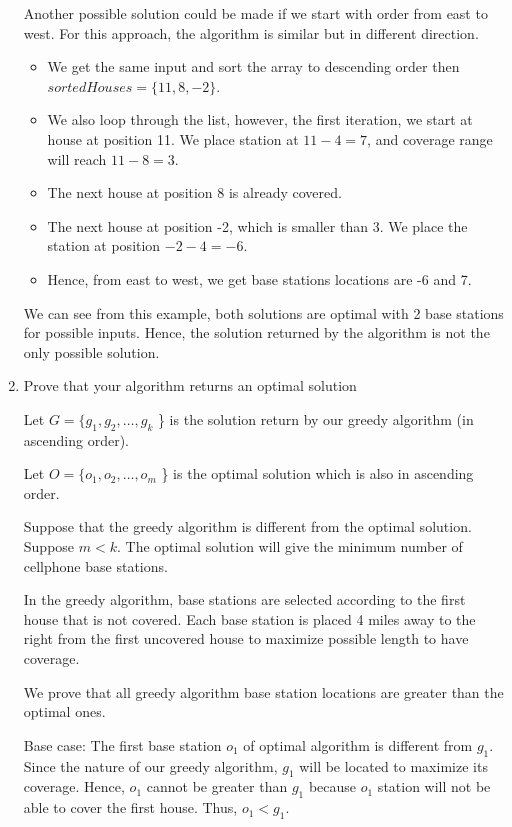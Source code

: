 \documentclass{cpsc413Solutions}
\begin{document}
\begin{problemlist}
\begin{problem}
\begin{answer}
\begin{enumerate}
    Another possible solution could be made if we start with order from east to west. For this approach, the algorithm is similar but in different direction.
    \begin{itemize}
        \item We get the same input and sort the array to descending order then $sortedHouses = \{11,8,-2\}$.
        \item We also loop through the list, however, the first iteration, we start at house at position 11. We place station at $11-4=7$, and coverage range will reach $11-8=3$.
        \item The next house at position 8 is already covered.
        \item The next house at position -2, which is smaller than 3. We place the station at position $-2-4=-6$.
        \item Hence, from east to west, we get base stations locations are -6 and 7.
    \end{itemize}
    
    We can see from this example, both solutions are optimal with 2 base stations for possible inputs. Hence, the solution returned by the algorithm is not the only possible solution.
    
    \item Prove that your algorithm returns an optimal solution
    
    Let $G  = \{g_1,g_2, \dots ,g_k$ \} is the solution return by our greedy algorithm (in ascending order).
    
    Let $O  = \{o_1,o_2, \dots ,o_m$ \} is the optimal solution which is also in ascending order.
    
    Suppose that the greedy algorithm is different from the optimal solution. Suppose $m<k$. The optimal solution will give the minimum number of cellphone base stations.
    
    In the greedy algorithm, base stations are selected according to the first house that is not covered. Each base station is placed 4 miles away to the right from the first uncovered house to maximize possible length to have coverage. 
    
    We prove that all greedy algorithm base station locations are greater than the optimal ones.
    
    Base case: The first base station $o_1$ of optimal algorithm is different from $g_1$. Since the nature of our greedy algorithm, $g_1$ will be located to maximize its coverage. Hence, $o_1$ cannot be greater than $g_1$ because $o_1$ station will not be able to cover the first house. Thus, $o_1 < g_1$.
    

\end{enumerate}
\end{answer}
\end{problem}
\end{problemlist}
\end{document}
